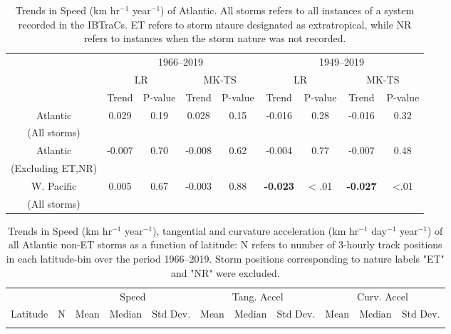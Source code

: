 \documentclass[wcd,manuscript]{copernicus}
\begin{document}
\begin{table*}[t]
  \caption{Trends in Speed (km hr$^{-1}$ year$^{-1}$) of Atlantic. All storms refers to all instances of a
    system recorded in the IBTraCs. ET refers to storm ntaure designated as extratropical, while NR refers to instances
    when the storm nature was not recorded. }

\begin{tabular}{|c|cccc|cccc|}
\hline
& \multicolumn{4}{|c|}{1966--2019}& \multicolumn{4}{|c|}{1949--2019}\\
& \multicolumn{2}{c}{LR} & \multicolumn{2}{c|}{MK-TS}& \multicolumn{2}{c}{LR} & \multicolumn{2}{c|}{MK-TS}\\
& Trend & P-value & Trend & P-value & Trend & P-value & Trend & P-value\\
\hline
Atlantic   &  0.029 & 0.19 &  0.028 & 0.15  & -0.016 & 0.28 & -0.016 & 0.32\\
(All storms) & & & & & & & &  \\
\hline
Atlantic  & -0.007 & 0.70 & -0.008 & 0.62 & -0.004 & 0.77 & -0.007 & 0.48\\
(Excluding ET,NR)  & & & & & & & &  \\
\hline
W. Pacific &  0.005 & 0.67 & -0.003 & 0.88 & \bf{-0.023} & < .01 & \bf{-0.027} & <.01\\
(All storms) & & & & & & & &  \\
\hline
\end{tabular}
\label{tab:ATLSA}
\end{table*}






\begin{table*}[t]
\caption{Trends in Speed (km hr$^{-1}$ year$^{-1}$), tangential and curvature acceleration  (km hr$^{-1}$ day$^{-1}$ year$^{-1}$) of all Atlantic non-ET storms as a function of latitude: N refers to number of 3-hourly track positions in each latitude-bin over the period 1966--2019. Storm positions corresponding to 
nature labels "ET" and "NR" were excluded.}

\begin{tabular}{cc|ccc|ccc|ccc}
\tophline
& & \multicolumn{3}{|c|}{Speed} & \multicolumn{3}{c|}{Tang. Accel} & \multicolumn{3}{c}{Curv. Accel}\\
\middlehline
Latitude & N & Mean & Median & Std Dev. & Mean & Median &  Std Dev.& Mean & Median & Std Dev.\\

\bottomhline
\end{tabular}
\label{tab:ATLSA}
\end{table*}
\end{document}
